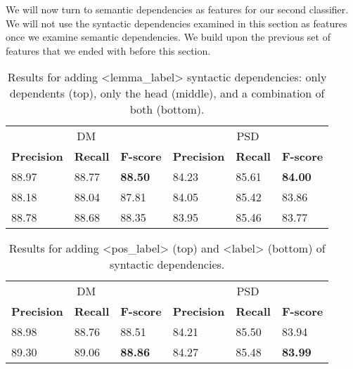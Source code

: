 We will now turn to semantic dependencies as features for our second classifier. We will not use the syntactic dependencies examined in this section as features once we examine semantic dependencies. We build upon the previous set of features that we ended with before this section.


\begin{table}
    \centering
    \smaller[0.2]
    \begin{tabular}{@{}llllll@{}}
        \toprule
        \multicolumn{3}{c}{DM}
        & \multicolumn{3}{c}{PSD} \\
        \textbf{Precision} & \textbf{Recall} & \textbf{F-score} & \textbf{Precision} & \textbf{Recall} & \textbf{F-score} \\
        \midrule
        88.97 & 88.77 & \textbf{88.50} & 84.23 & 85.61 & \textbf{84.00} \\
        88.18 & 88.04 & 87.81 & 84.05 & 85.42 & 83.86 \\
        88.78 & 88.68 & 88.35 & 83.95 & 85.46 & 83.77 \\
        \bottomrule
    \end{tabular}
    \caption{Results for adding <lemma\_label> syntactic dependencies: only dependents (top), only the head (middle), and a combination of both (bottom).}
    \label{table:dependents_head}
\end{table}

\begin{table}
    \centering
    \smaller[0.2]
    \begin{tabular}{@{}llllll@{}}
        \toprule
        \multicolumn{3}{c}{DM}
        & \multicolumn{3}{c}{PSD} \\
        \textbf{Precision} & \textbf{Recall} & \textbf{F-score} & \textbf{Precision} & \textbf{Recall} & \textbf{F-score} \\
        88.98 & 88.76 & 88.51 & 84.21 & 85.50 & 83.94 \\
        89.30 & 89.06 & \textbf{88.86} & 84.27 & 85.48 & \textbf{83.99} \\
        \bottomrule
    \end{tabular}
    \caption{Results for adding <pos\_label> (top) and <label> (bottom) of syntactic dependencies.}
    \label{table:dependents_label}
\end{table}


